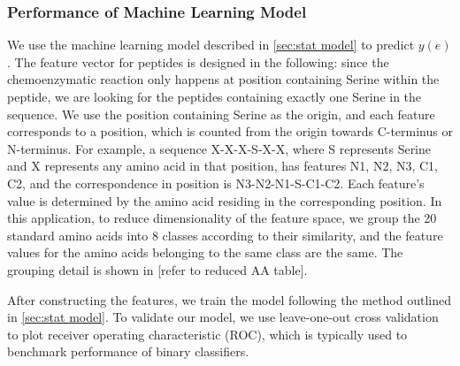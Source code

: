 \documentclass[11pt]{article}
\begin{document}
\subsubsection{Performance of Machine Learning Model}
We use the machine learning model described in \ref{sec:stat model} to predict $y(e)$.
The feature vector for peptides is designed in the following: since the chemoenzymatic
reaction only happens at position containing Serine within the peptide, we are looking 
for the peptides containing exactly one Serine in the sequence. We use the position 
containing Serine as the origin, and each feature corresponds to a position, which is
counted from the origin towards C-terminus or N-terminus. For example, a sequence
X-X-X-S-X-X, where S represents Serine and X represents any amino acid in that
position, has features N1, N2, N3, C1, C2, and the correspondence in position is
N3-N2-N1-S-C1-C2. Each feature's value is determined by the amino acid residing in
the corresponding position. In this application, to reduce dimensionality of the 
feature space, we group the 20 standard amino acids into 8 classes according to
their similarity, and the feature values for the amino acids belonging to the 
same class are the same. The grouping detail is shown in [refer to reduced AA table].

After constructing the features, we train the model following the method outlined
in \ref{sec:stat model}. To validate our model, we use leave-one-out 
cross validation to plot receiver operating characteristic (ROC), which
is typically used to benchmark performance of binary classifiers.
\end{document}
